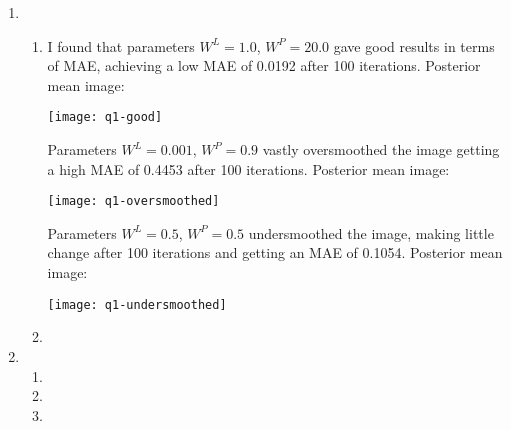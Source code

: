 \documentclass[12pt]{article}
\begin{document}
\begin{enumerate}

\item %
\begin{enumerate}
\item
I found that parameters $W^L=1.0$, $W^P=20.0$ gave good results in terms of MAE, achieving a low MAE of 0.0192 after 100 iterations. Posterior mean image:
\begin{center}
\texttt{[image: q1-good]}
\end{center}

Parameters $W^L=0.001$, $W^P=0.9$ vastly oversmoothed the image getting a high MAE of 0.4453 after 100 iterations. Posterior mean image:
\begin{center}
\texttt{[image: q1-oversmoothed]}
\end{center}

Parameters $W^L=0.5$, $W^P=0.5$ undersmoothed the image, making little change after 100 iterations and getting an MAE of 0.1054. Posterior mean image:
\begin{center}
\texttt{[image: q1-undersmoothed]}
\end{center}

\item


\end{enumerate}

\item %
\begin{enumerate}
\item
\item
\item
\end{enumerate}

\end{enumerate}
\end{document}
